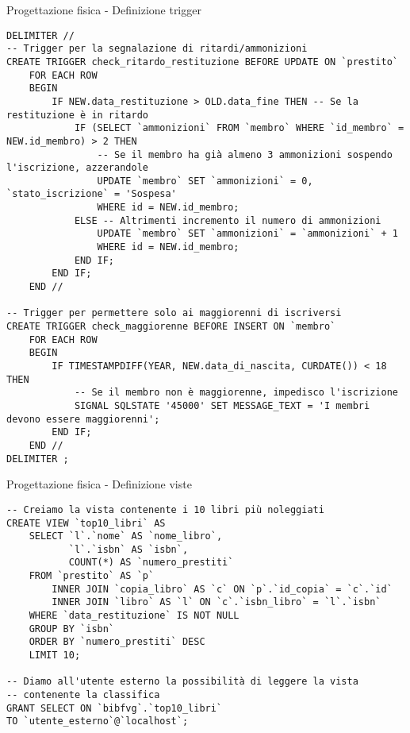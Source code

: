 \begin{frame}[fragile]{Progettazione fisica - Definizione trigger}
    \begin{verbatim}
DELIMITER //
-- Trigger per la segnalazione di ritardi/ammonizioni
CREATE TRIGGER check_ritardo_restituzione BEFORE UPDATE ON `prestito`
    FOR EACH ROW
    BEGIN
        IF NEW.data_restituzione > OLD.data_fine THEN -- Se la restituzione è in ritardo
            IF (SELECT `ammonizioni` FROM `membro` WHERE `id_membro` = NEW.id_membro) > 2 THEN
                -- Se il membro ha già almeno 3 ammonizioni sospendo l'iscrizione, azzerandole
                UPDATE `membro` SET `ammonizioni` = 0, `stato_iscrizione` = 'Sospesa'
                WHERE id = NEW.id_membro;
            ELSE -- Altrimenti incremento il numero di ammonizioni
                UPDATE `membro` SET `ammonizioni` = `ammonizioni` + 1
                WHERE id = NEW.id_membro;
            END IF;
        END IF;
    END //

-- Trigger per permettere solo ai maggiorenni di iscriversi
CREATE TRIGGER check_maggiorenne BEFORE INSERT ON `membro`
    FOR EACH ROW
    BEGIN
        IF TIMESTAMPDIFF(YEAR, NEW.data_di_nascita, CURDATE()) < 18 THEN
            -- Se il membro non è maggiorenne, impedisco l'iscrizione
            SIGNAL SQLSTATE '45000' SET MESSAGE_TEXT = 'I membri devono essere maggiorenni';
        END IF;
    END //
DELIMITER ;
    \end{verbatim}
\end{frame}

\begin{frame}[fragile]{Progettazione fisica - Definizione viste}
    \begin{verbatim}
-- Creiamo la vista contenente i 10 libri più noleggiati
CREATE VIEW `top10_libri` AS
    SELECT `l`.`nome` AS `nome_libro`,
           `l`.`isbn` AS `isbn`,
           COUNT(*) AS `numero_prestiti`
    FROM `prestito` AS `p`
        INNER JOIN `copia_libro` AS `c` ON `p`.`id_copia` = `c`.`id` 
        INNER JOIN `libro` AS `l` ON `c`.`isbn_libro` = `l`.`isbn`
    WHERE `data_restituzione` IS NOT NULL
    GROUP BY `isbn`
    ORDER BY `numero_prestiti` DESC
    LIMIT 10;

-- Diamo all'utente esterno la possibilità di leggere la vista
-- contenente la classifica
GRANT SELECT ON `bibfvg`.`top10_libri`
TO `utente_esterno`@`localhost`;
    \end{verbatim}
\end{frame}

